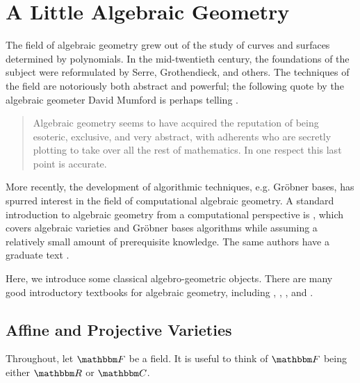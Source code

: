 \documentclass[11pt,titlepage]{article}
\numberwithin{equation}{section}
\begin{document}


\appendix

\section{A Little Algebraic Geometry}

    The field of algebraic geometry grew out of the study of curves and surfaces
    determined by polynomials.  In the mid-twentieth century, the foundations of
    the subject were reformulated by Serre, Grothendieck, and others.  The
    techniques of the field are notoriously both abstract and powerful; the
    following quote by the algebraic geometer David Mumford is perhaps telling
    \cite{Mum99}.
    \begin{quote}
        Algebraic geometry seems to have acquired the reputation of being
        esoteric, exclusive, and very abstract, with adherents who are secretly
        plotting to take over all the rest of mathematics.  In one respect this
        last point is accurate.
    \end{quote}
    More recently, the development of algorithmic techniques, e.g. Gröbner
    bases, has spurred interest in the field of computational algebraic
    geometry.  A standard introduction to algebraic geometry from a
    computational perspective is \cite{CLO97}, which covers algebraic varieties
    and Gröbner bases algorithms while assuming a relatively small amount of
    prerequisite knowledge.  The same authors have a graduate text \cite{CLO05}.

    Here, we introduce some classical algebro-geometric objects.  There are
    many good introductory textbooks for algebraic geometry, including
    \cite{Invitation}, \cite{Sha94}, \cite{Hart}, and \cite{Mum99}.

\subsection{Affine and Projective Varieties}
    \label{sec:varieties}
    Throughout, let $\F$ be a field.  It is useful to think of $\F$ being either
    $\R$ or $\C$.
\end{document}
